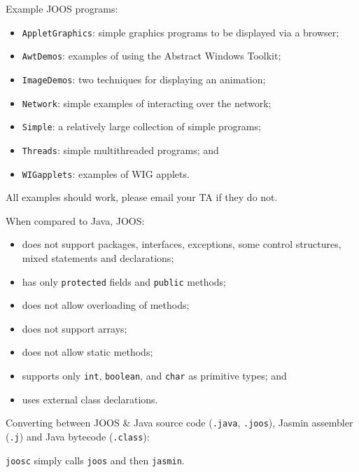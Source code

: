 \begin{slide*}
Example JOOS programs:
\begin{itemize}
\item {\tt AppletGraphics}:
simple graphics programs to be displayed via a browser;
\item {\tt AwtDemos}:
 examples of using the Abstract Windows Toolkit;
\item {\tt ImageDemos}:
two techniques for displaying an animation;
\item {\tt Network}:
simple examples of interacting over the network;
\item {\tt Simple}:
a relatively large collection of simple programs;
\item {\tt Threads}: simple multithreaded programs; and
\item {\tt WIGapplets}: examples of WIG applets.
\end{itemize}

\vspace{0.1in}

All examples should work, please email your TA if they do not.

\vfil
\end{slide*}

\begin{slide*}
When compared to Java, JOOS:
\begin{itemize}
\item does not support packages, interfaces, exceptions, some control structures,
mixed statements and declarations;
\item has only {\tt protected} fields and {\tt public} methods;
\item does not allow overloading of methods;
\item does not support arrays;
\item does not allow static methods;
\item supports only {\tt int}, {\tt boolean}, and {\tt char} as primitive types; and
\item uses external class declarations.
\end{itemize}
\vfil
\end{slide*}

\begin{slide*}
Converting between JOOS \& Java source code ({\tt *.java}, {\tt *.joos}), Jasmin
assembler ({\tt *.j}) and Java bytecode ({\tt *.class}):

\begin{center}
\end{center}

{\tt joosc} simply calls {\tt joos} and then {\tt jasmin}.

\vfil
\end{slide*}


